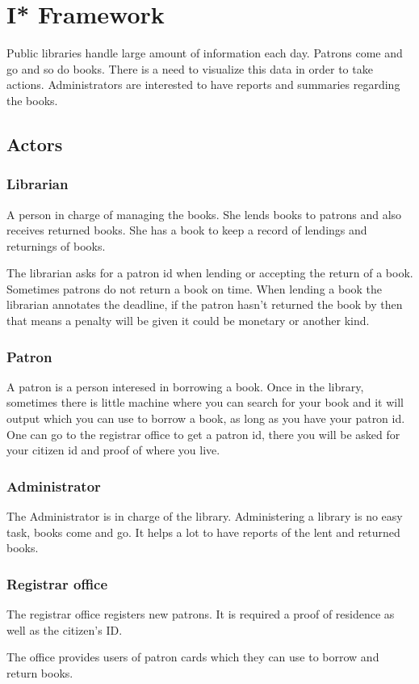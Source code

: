 \section{I* Framework}
Public libraries handle large amount of information each day. Patrons come and go and so do books. There is a need to visualize this data in order to take actions. Administrators are interested to have reports and summaries regarding the books.

\subsection{Actors}
\subsubsection{Librarian}
A person in charge of managing the books. She lends books to patrons and also receives returned books. She has a book to keep a record of lendings and returnings of books.

The librarian asks for a patron id when lending or accepting the return of a book. Sometimes patrons do not return a book on time. When lending a book the librarian annotates the deadline, if the patron hasn't returned the book by then that means a penalty will be given it could be monetary or another kind.

\subsubsection{Patron}
A patron is a person interesed in borrowing a book. Once in the library, sometimes there is little machine where you can search for your book and it will output which you can use to borrow a book, as long as you have your patron id. One can go to the registrar office to get a patron id, there you will be asked for your citizen id and proof of where you live.

\subsubsection{Administrator}
The Administrator is in charge of the library. Administering a library is no easy task, books come and go. It helps a lot to have reports of the lent and returned books.

\subsubsection{Registrar office}
The registrar office registers new patrons. It is required a proof of residence as well as the citizen's ID. 

The office provides users of patron cards which they can use to borrow and return books.

